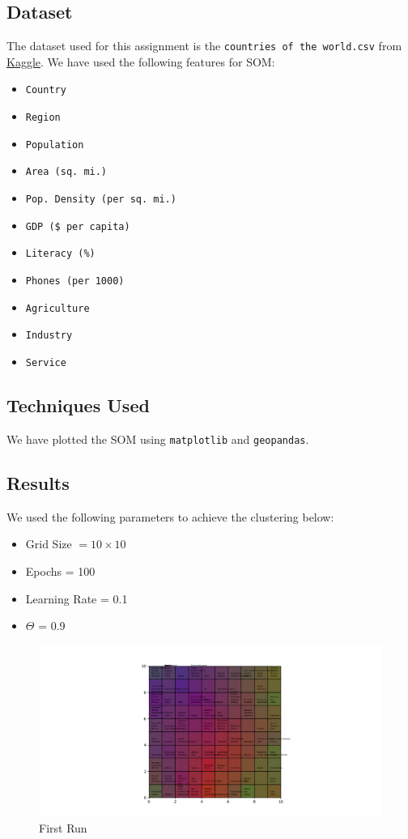 \documentclass{article}
\begin{document}
\subsection{Dataset}
The dataset used for this assignment is the \texttt{countries of the world.csv} from \href{https://www.kaggle.com/datasets/fernandol/countries-of-the-world}{Kaggle}. We have used the following features for SOM:
\begin{itemize}
    \item \texttt{Country}
    \item \texttt{Region}
    \item \texttt{Population}
    \item \texttt{Area (sq. mi.)}
    \item \texttt{Pop. Density (per sq. mi.)}
    \item \texttt{GDP (\$ per capita)}
    \item \texttt{Literacy (\%) }
    \item \texttt{Phones (per 1000)}
    \item \texttt{Agriculture}
    \item \texttt{Industry}
    \item \texttt{Service}
\end{itemize}

\subsection{Techniques Used}
We have plotted the SOM using \texttt{matplotlib} and \texttt{geopandas}.

\subsection{Results}
We used the following parameters to achieve the clustering below:
\begin{itemize}
    \item Grid Size $= 10 \times 10$
    \item Epochs = 100
    \item Learning Rate = 0.1 
    \item $\Theta$ = 0.9
\end{itemize}

\begin{figure}[H]
  \centering
  \includegraphics[width=1\linewidth]{images/som_grid1.png}
  \caption{First Run}
\end{figure}
\end{document}
